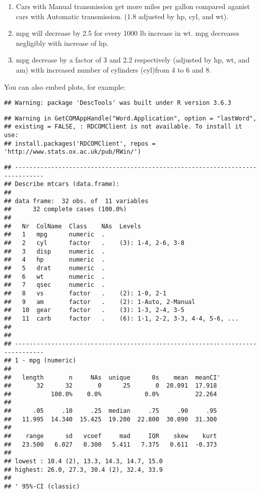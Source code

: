 \documentclass[
]{article}
\providecommand{\tightlist}{%
  \setlength{\itemsep}{0pt}\setlength{\parskip}{0pt}}
\begin{document}
\begin{enumerate}
\def\labelenumi{\arabic{enumi}.}
\tightlist
\item
  Cars with Manual transmission get more miles per gallon compared
  aganist cars with Automatic transmission. (1.8 adjusted by hp, cyl,
  and wt).
\item
  mpg will decrease by 2.5 for every 1000 lb increase in wt. mpg
  decreases negligibly with increase of hp.
\item
  mpg decrease by a factor of 3 and 2.2 respectively (adjusted by hp,
  wt, and am) with increased number of cylinders (cyl)from 4 to 6 and 8.
\end{enumerate}

You can also embed plots, for example:

\begin{verbatim}
## Warning: package 'DescTools' was built under R version 3.6.3
\end{verbatim}

\begin{verbatim}
## Warning in GetCOMAppHandle("Word.Application", option = "lastWord",
## existing = FALSE, : RDCOMClient is not available. To install it use:
## install.packages('RDCOMClient', repos = 'http://www.stats.ox.ac.uk/pub/RWin/')
\end{verbatim}

\begin{verbatim}
## ------------------------------------------------------------------------------ 
## Describe mtcars (data.frame):
## 
## data frame:  32 obs. of  11 variables
##      32 complete cases (100.0%)
## 
##   Nr  ColName  Class    NAs  Levels                           
##   1   mpg      numeric  .                                     
##   2   cyl      factor   .    (3): 1-4, 2-6, 3-8               
##   3   disp     numeric  .                                     
##   4   hp       numeric  .                                     
##   5   drat     numeric  .                                     
##   6   wt       numeric  .                                     
##   7   qsec     numeric  .                                     
##   8   vs       factor   .    (2): 1-0, 2-1                    
##   9   am       factor   .    (2): 1-Auto, 2-Manual            
##   10  gear     factor   .    (3): 1-3, 2-4, 3-5               
##   11  carb     factor   .    (6): 1-1, 2-2, 3-3, 4-4, 5-6, ...
## 
## 
## ------------------------------------------------------------------------------ 
## 1 - mpg (numeric)
## 
##   length       n     NAs  unique      0s    mean  meanCI'
##       32      32       0      25       0  20.091  17.918
##           100.0%    0.0%            0.0%          22.264
##                                                         
##      .05     .10     .25  median     .75     .90     .95
##   11.995  14.340  15.425  19.200  22.800  30.090  31.300
##                                                         
##    range      sd   vcoef     mad     IQR    skew    kurt
##   23.500   6.027   0.300   5.411   7.375   0.611  -0.373
##                                                         
## lowest : 10.4 (2), 13.3, 14.3, 14.7, 15.0
## highest: 26.0, 27.3, 30.4 (2), 32.4, 33.9
## 
## ' 95%-CI (classic)
\end{verbatim}
\end{document}
